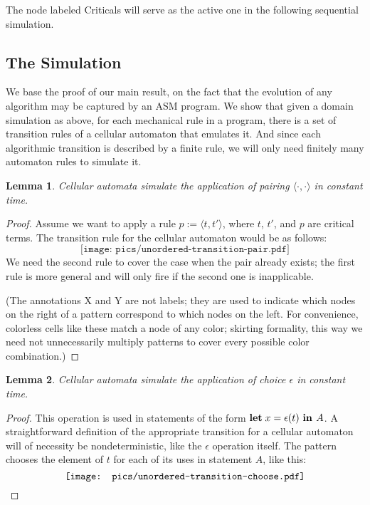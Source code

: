 \documentclass[submission,copyright,creativecommons,english]{eptcs}
\newtheorem{lemma}{Lemma}
\newcommand{\IN}{\mbox{~\bf in~}}
\newcommand{\LET}{\mbox{\bf let}\;}
\newcommand{\Choose}{\epsilon}   \newcommand{\TheUnique}{\;\mbox{\bf TheUnique}\;}
\begin{document}
{The node labeled \textsf{Criticals} will serve as the active one in the following sequential simulation.}

\subsection{The Simulation}

We base the proof of our main result, on the fact that the evolution of any algorithm may be captured by an ASM program.
We show that given a domain simulation as above,
for each mechanical rule in a program, there is a set of transition rules of a cellular automaton that emulates it.
And since each algorithmic transition is described  by a finite rule, we will only need finitely many
automaton rules to simulate it.

 \begin{lemma}
Cellular automata  simulate the application of pairing $\langle\cdot,\cdot\rangle$ in constant time.
\end{lemma}

\begin{proof}
 Assume  we want to apply a rule  $p:=\langle t,t' \rangle$, where $t$, $t'$, and $p$ are  critical terms.
 The transition rule for the cellular automaton would be as follows:
\[\texttt{[image: pics/unordered-transition-pair.pdf]}\]
{We need the second rule to cover the case when the pair  already exists;
the first rule is more general and will only fire if the second one is inapplicable.}

{(The annotations \textsf{X} and \textsf{Y} are not labels; they are used to indicate which nodes on the right of a pattern correspond to which nodes on the left.
For convenience, colorless cells like these match a node of any color;
skirting formality, this way we need not unnecessarily multiply patterns to cover every possible color combination.)}
\end{proof}

 \begin{lemma}
Cellular automata  simulate the application of choice $\Choose$ in constant time.\end{lemma}

\begin{proof}
This operation is used in statements of the form $\LET x=\Choose(t) \IN A$.
A straightforward definition of the appropriate transition for a cellular automaton will of necessity be nondeterministic, like the $\Choose$ operation itself.
The pattern chooses the element of $t$ for each of its uses in statement $A$, like this:
\[\texttt{[image: pics/unordered-transition-choose.pdf]}\vspace*{-5mm}\]
\end{proof}
\end{document}
